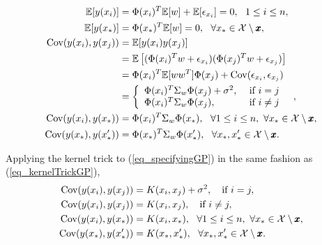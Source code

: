 \begin{equation} \label{eq_specifyingGP}
  \begin{aligned}
    \mathbb{E}[y(x_i)] &= \Phi(x_i)^T \mathbb{E}[w] + \mathbb{E}[\epsilon_{x_i}] = 0, \ \ 1 \leq i \leq n, \\
    \mathbb{E}[y(x_*)] &= \Phi(x_*)^T \mathbb{E}[w] = 0, \ \ \forall x_* \in \mathcal{X \setminus \pmb{x}}, \\ 
    \textup{Cov}(y(x_i),y(x_j)) &= \mathbb{E}[y(x_i)y(x_j)] \\
                 &= \mathbb{E}\left[
                 (\Phi(x_i)^T w + \epsilon_{x_i}) 
                 (\Phi(x_j)^T w + \epsilon_{x_j}) 
                 \right] \\
                 &= \Phi(x_i)^T \mathbb{E}[ww^T] \Phi(x_j) + \textup{Cov}(\epsilon_{x_i},\epsilon_{x_j}) \\
                 &= \left\{
                 \begin{array}{l l}
                   \Phi(x_i)^T \Sigma_w \Phi(x_j) + \sigma^2, & \text{ if } i = j \\
                   \Phi(x_i)^T \Sigma_w \Phi(x_j), & \text{ if } i \neq j \\
                 \end{array}
                 \right. \ \ , \\
    \textup{Cov}(y(x_i),y(x_*)) &= \Phi(x_i)^T \Sigma_w \Phi(x_*), \ \ \forall 1 \leq i \leq n, \ \forall x_* \in \mathcal{X \setminus \pmb{x}}, \\
    \textup{Cov}(y(x_*),y(x'_*)) &= \Phi(x_*)^T \Sigma_w \Phi(x'_*), \ \ \forall x_*, x'_* \in \mathcal{X \setminus \pmb{x}}.
  \end{aligned}
\end{equation}


Applying the kernel trick to (\ref{eq_specifyingGP}) in the same fashion as (\ref{eq_kernelTrickGP}),
\begin{equation} \label{eq_specifyingGPkernels}
  \begin{aligned}
    \textup{Cov}(y(x_i),y(x_j)) &= K(x_i,x_j) + \sigma^2, \ \ \text{ if } i = j, \\
    \textup{Cov}(y(x_i),y(x_j)) &= K(x_i,x_j), \ \ \text{ if } i \neq j, \\
    \textup{Cov}(y(x_i),y(x_*)) &= K(x_i,x_*), \ \ \forall 1 \leq i \leq n, \ \forall x_* \in \mathcal{X \setminus \pmb{x}}, \\
    \textup{Cov}(y(x_*),y(x'_*)) &= K(x_*,x'_*), \ \ \forall x_*, x'_* \in \mathcal{X \setminus \pmb{x}}.
  \end{aligned}
\end{equation}

